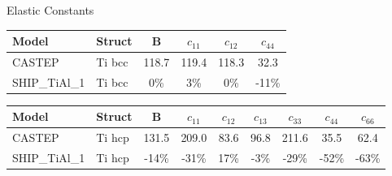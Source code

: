 \documentclass[preview]{standalone}
\begin{document}
\begin{center}
\textnormal{Elastic Constants} \\
\vspace{2mm}
\begin{tabular}{ l l c c c c } \toprule 
Model & Struct & B & $c_{11}$ & $c_{12}$ & $c_{44}$\\ \midrule 
CASTEP & Ti bcc & 118.7 & 119.4 & 118.3 & 32.3\\ 
SHIP\_TiAl\_1 & Ti bcc & 0\% & 3\% & 0\% & -11\%\\ 
\end{tabular} \bigskip \begin{tabular}{ l l c c c c c c c } \toprule 
Model & Struct & B & $c_{11}$ & $c_{12}$ & $c_{13}$ & $c_{33}$ & $c_{44}$ & $c_{66}$\\ \midrule 
CASTEP & Ti hcp & 131.5 & 209.0 & 83.6 & 96.8 & 211.6 & 35.5 & 62.4\\ 
SHIP\_TiAl\_1 & Ti hcp & -14\% & -31\% & 17\% & -3\% & -29\% & -52\% & -63\%\\ 
\end{tabular} \bigskip 
\end{center}
\end{document}
